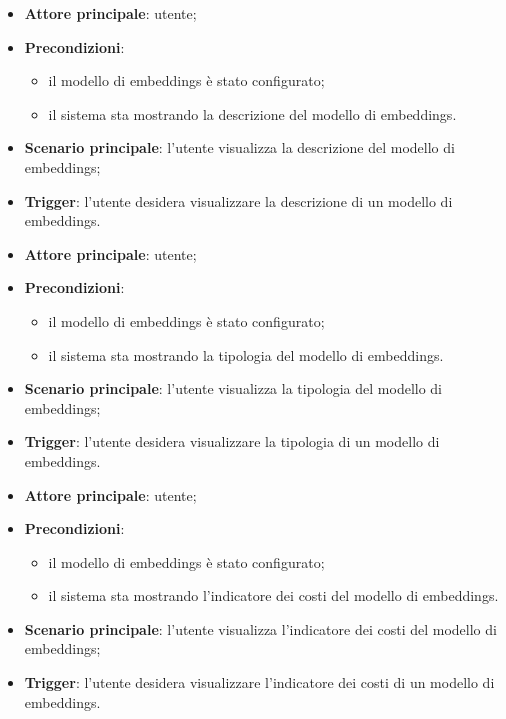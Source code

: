 \documentclass[10pt, a4paper]{article}
\begin{document}
    \begin{itemize}
        \item \textbf{Attore principale}: utente;
        \item \textbf{Precondizioni}:
        \begin{itemize}
            \item il modello di embeddings è stato configurato;
            \item il sistema sta mostrando la descrizione del modello di embeddings.
        \end{itemize}
        \item \textbf{Scenario principale}: l'utente visualizza la descrizione del modello di embeddings;
        \item \textbf{Trigger}: l’utente desidera visualizzare la descrizione di un modello di embeddings.
    \end{itemize}

    \begin{itemize}
        \item \textbf{Attore principale}: utente;
        \item \textbf{Precondizioni}:
        \begin{itemize}
            \item il modello di embeddings è stato configurato;
            \item il sistema sta mostrando la tipologia del modello di embeddings.
        \end{itemize}
        \item \textbf{Scenario principale}: l'utente visualizza la tipologia del modello di embeddings;
        \item \textbf{Trigger}: l’utente desidera visualizzare la tipologia di un modello di embeddings.
    \end{itemize}

    \begin{itemize}
        \item \textbf{Attore principale}: utente;
        \item \textbf{Precondizioni}:
        \begin{itemize}
            \item il modello di embeddings è stato configurato;
            \item il sistema sta mostrando l'indicatore dei costi del modello di embeddings.
        \end{itemize}
        \item \textbf{Scenario principale}: l'utente visualizza l'indicatore dei costi del modello di embeddings;
        \item \textbf{Trigger}: l’utente desidera visualizzare l'indicatore dei costi di un modello di embeddings.
    \end{itemize}
\end{document}

